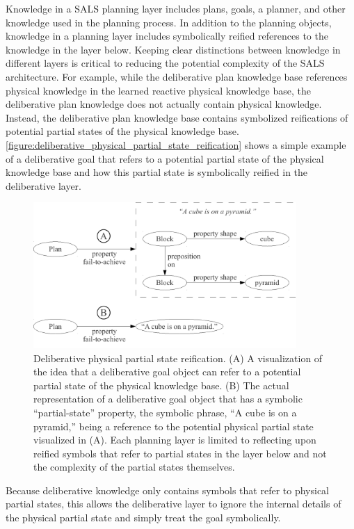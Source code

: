 Knowledge in a SALS planning layer includes plans, goals, a planner,
and other knowledge used in the planning process.  In addition to the
planning objects, knowledge in a planning layer includes symbolically
reified references to the knowledge in the layer below.  Keeping clear
distinctions between knowledge in different layers is critical to
reducing the potential complexity of the SALS architecture.  For
example, while the deliberative plan knowledge base references
physical knowledge in the learned reactive physical knowledge base,
the deliberative plan knowledge does not actually contain physical
knowledge.  Instead, the deliberative plan knowledge base contains
symbolized reifications of potential partial states of the physical
knowledge base.
{\mbox{\autoref{figure:deliberative_physical_partial_state_reification}}}
shows a simple example of a deliberative goal that refers to a
potential partial state of the physical knowledge base and how this
partial state is symbolically reified in the deliberative layer.
\begin{figure}
\centering
\includegraphics[width=10cm]{gfx/deliberative_physical_partial_state_reification}
\caption[Deliberative physical partial state
  reification.]{Deliberative physical partial state reification.  (A)
  A visualization of the idea that a deliberative goal object can
  refer to a potential partial state of the physical knowledge base.
  (B) The actual representation of a deliberative goal object that has
  a symbolic ``partial-state'' property, the symbolic phrase, ``A cube
  is on a pyramid,'' being a reference to the potential physical
  partial state visualized in (A).  Each planning layer is limited to
  reflecting upon reified symbols that refer to partial states in the
  layer below and not the complexity of the partial states
  themselves.}
\label{figure:deliberative_physical_partial_state_reification}
\end{figure}
Because deliberative knowledge only contains symbols that refer to
physical partial states, this allows the deliberative layer to ignore
the internal details of the physical partial state and simply treat
the goal symbolically.


